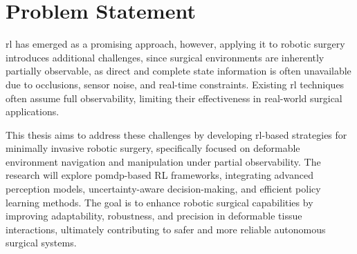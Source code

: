 \section{Problem Statement}
\gls{rl} has emerged as a promising approach, 
however, applying it to robotic surgery introduces additional challenges, since surgical environments 
are inherently partially observable, as direct and complete state information is 
often unavailable due to occlusions, sensor noise, and real-time constraints. 
Existing \gls{rl} techniques often assume full observability, limiting their 
effectiveness in real-world surgical applications.

This thesis aims to address these challenges by developing \gls{rl}-based 
strategies for minimally invasive robotic surgery, specifically focused on deformable environment navigation 
and manipulation under partial observability. The research will explore 
\gls{pomdp}-based RL frameworks, integrating advanced perception models, uncertainty-aware 
decision-making, and efficient policy learning methods. The goal is to enhance 
robotic surgical capabilities by improving adaptability, robustness, and precision 
in deformable tissue interactions, ultimately contributing to safer and more reliable 
autonomous surgical systems.




